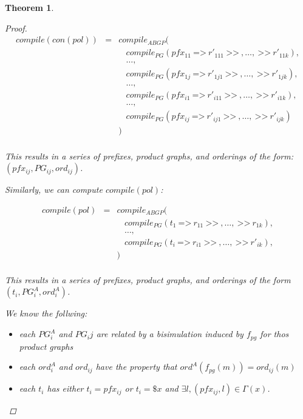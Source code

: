\documentclass[twocolumn]{sig-alternate-10pt}
\newcommand{\Prefer}{\texttt{>>}}
\newcommand{\Path}{\texttt{=>}}
\newtheorem{thm}{Theorem}[section]
\begin{document}
\begin{thm}
\begin{proof}
    \[ \begin{array}{lcl}
        compile(con(pol)) &=& compile_{ABGP}( \\
                          & & ~~~~ compile_{PG}(pfx_{11} ~\Path~ r'_{111} ~\Prefer~,\dots, ~\Prefer~ r'_{11k} ), \\
                          & & ~~~~ \dots, \\
                          & & ~~~~ compile_{PG}(pfx_{1j} ~\Path~ r'_{1j1} ~\Prefer~,\dots, ~\Prefer~ r'_{1jk} ), \\
                          & & ~~~~ \dots, \\
                          & & ~~~~ compile_{PG}(pfx_{i1} ~\Path~ r'_{i11} ~\Prefer~,\dots, ~\Prefer~ r'_{i1k} ), \\
                          & & ~~~~ \dots, \\
                          & & ~~~~ compile_{PG}(pfx_{ij} ~\Path~ r'_{ij1} ~\Prefer~,\dots, ~\Prefer~ r'_{ijk} ) \\
                          & & ) \\
    \end{array} \]
 
    This results in a series of prefixes, product graphs, and orderings of the form: $(pfx_{ij}, PG_{ij}, ord_{ij})$.

    \vspace{1em}
    Similarly, we can compute $compile(pol)$:

    \[ \begin{array}{lcl}
        compile(pol) &=& compile_{ABGP}( \\
                     & & ~~~~ compile_{PG}(t_1 ~\Path~ r_{11} ~\Prefer~,\dots, ~\Prefer~ r_{1k} ), \\
                     & & ~~~~ \dots, \\
                     & & ~~~~ compile_{PG}(t_i ~\Path~ r_{i1} ~\Prefer~,\dots, ~\Prefer~ r'_{ik} ), \\
                     & & ) \\
    \end{array} \]

    This results in a series of prefixes, product graphs, and orderings of the form $(t_i, PG^A_i, ord^A_i)$.

    We know the follwing:

    \begin{itemize}
      \item each $PG^A_i$ and $PG_ij$ are related by a bisimulation induced by $f_{pg}$ for thos product graphs
      \item each $ord^A_i$ and $ord_{ij}$ have the property that $ord^A(f_{pg}(m)) = ord_{ij}(m)$
      \item each $t_i$ has either $t_i = pfx_{ij}$ or $t_i = \$x$ and $\exists l, (pfx_{ij},l) \in \Gamma(x)$.
    \end{itemize}
      



\end{proof}
\end{thm}
\end{document}

